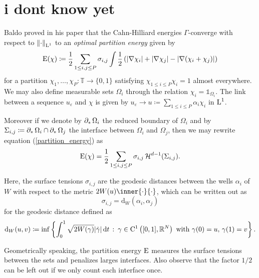 \chapter{i dont know yet}

Baldo proved in his paper \cite{baldo_minimal_interface_criterion} that the Cahn-Hilliard energies $ \Gamma $-converge with respect to $ \norm{ \cdot }_{\operatorname{L}^{ 1 }} $ to an \emph{optimal partition energy} given by
\begin{equation}
	\label{partition_energy}
	\operatorname{E} ( \chi ) 
	\coloneqq
	\frac{ 1 }{ 2 }
	\sum_{ 1 \leq i, j \leq P }
	\sigma_{ i , j }
	\int
	\frac{ 1 }{ 2 }
	\left(
	\abs{ \nabla \chi_{ i } }
	+
	\abs{ \nabla \chi_{ j } }
	-
	\abs{ \nabla ( \chi_{ i } + \chi_{ j } ) }
	\right)
\end{equation}
for a partition $ \chi_{ 1 }, \dotsc, \chi_{ P } \colon \mathbb{ T } \to \{ 0, 1 \} $ satisfying $ \chi_{ 1 \leq i \leq P } \chi_{ i } = 1 $ almost everywhere. We may also define measurable sets $ \Omega_{ i } $ through the relation $ \chi_{ i } = \mathds{1}_{ \Omega_{ i } }  $. The link between a sequence $ u_{ \varepsilon} $ and $ \chi $ is given by $ u_{ \varepsilon} \to u \coloneqq \sum_{ 1 \leq i \leq P } \alpha_{ i } \chi_{ i } $ in $ \operatorname{L}^{ 1 } $. 

Moreover if we denote by $ \operatorname{\partial_{ \ast }} \Omega_{ i } $ the reduced boundary of $ \Omega_{ i } $ and by $ \Sigma_{ i , j } \coloneqq \operatorname{\partial_{ \ast }} \Omega_{ i } \cap \operatorname{\partial_{ \ast }} \Omega_{ j } $ the interface between $ \Omega_{ i } $ and $ \Omega_{ j } $, then we may rewrite equation (\ref{partition_energy}) as 
\begin{equation*}
	\operatorname{E} ( \chi ) 
	=
	\frac{ 1 }{ 2 }
	\sum_{1 \leq i, j \leq P }
	\sigma_{ i , j } \operatorname{\mathcal{H}}^{ d - 1 } ( \Sigma_{ i , j } ).
\end{equation*}

Here, the surface tensions $ \sigma_{ i , j } $ are the geodesic distances between the wells $ \alpha_{ i } $ of $ W $ with respect to the metric $ 2W(u) \inner{\cdot}{\cdot} $, which can be written out as
\begin{equation*}
	\sigma_{ i , j } = \mathrm{ d }_{ W } ( \alpha_{ i } , \alpha_{ j } )
\end{equation*}
for the geodesic distance defined as
\begin{equation}
	\mathrm{ d }_{ W } ( u, v )
	\coloneqq
	\inf
	\left\{
	\int_{ 0 }^{ 1 }
	\sqrt{ 2 W ( \gamma ) }
	\abs{ \dot{ \gamma }  }
	\dd{t}
	\,
	\colon
	\, \gamma \in \mathrm{ C }^{ 1 } \left( [0, 1 ], \mathbb{ R }^{ N } \right) \text{ with } \gamma( 0 ) = u,\, \gamma( 1 )= v 
	\right\}.
\end{equation}

Geometrically speaking, the partition energy $ \operatorname{E} $ measures the surface tensions between the sets and penalizes larges interfaces. Also observe that the factor $ 1/2 $ can be left out if we only count each interface once.